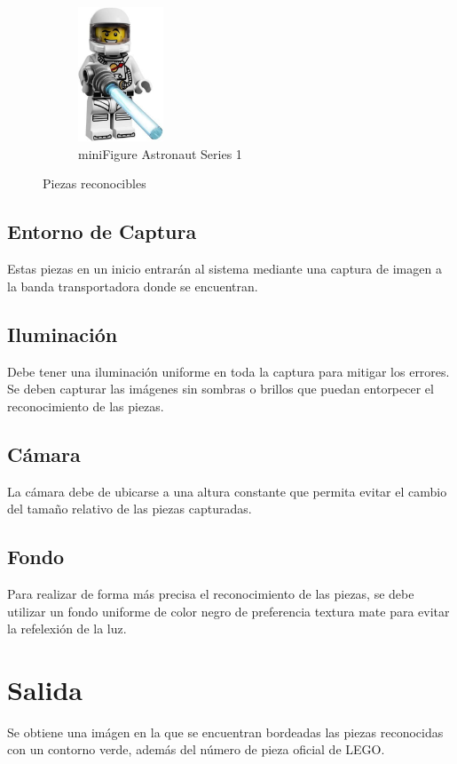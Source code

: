 \documentclass[letterpaper]{scrreprt}
\begin{document}
\begin{figure}[H]
\begin{subfigure}{0.5\textwidth}
		\label{fig:subim3}
	\end{subfigure}
	\begin{subfigure}{0.5\textwidth}
		\centering
		\includegraphics[width=0.4\linewidth, height=4cm]{Bricks/astronaut.jpg}
		\caption{miniFigure Astronaut Series 1}
		\label{fig:subim3}
	\end{subfigure}
	\caption{Piezas reconocibles}
	\label{fig:image2}
\end{figure}

\subsection{Entorno de Captura}
Estas piezas en un inicio entrarán al sistema mediante una captura de imagen a la banda transportadora donde se encuentran. 
\subsection{Iluminación}
Debe tener una iluminación uniforme en toda la captura para mitigar los errores. Se deben capturar las imágenes sin sombras o brillos que puedan entorpecer el reconocimiento de las piezas.
\subsection{Cámara}
La cámara debe de ubicarse a una altura constante que permita evitar el cambio del tamaño relativo de las piezas capturadas.
\subsection{Fondo}
Para realizar de forma más precisa el reconocimiento de las piezas, se debe utilizar un fondo uniforme de color negro de preferencia textura mate para evitar la refelexión de la luz.
\section{Salida}
Se obtiene una imágen en la que se encuentran bordeadas las piezas reconocidas con un contorno verde, además del número de pieza oficial de LEGO.
\end{document}

